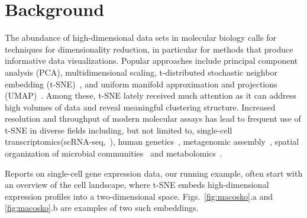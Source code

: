 \documentclass[twocolumn]{bmcart}
\begin{document}


\section*{Background}

The abundance of high-dimensional data sets in molecular biology calls for
techniques for dimensionality reduction, in particular for methods that produce informative data visualizations. Popular approaches include 
principal component analysis (PCA),
multidimensional scaling, t-distributed stochastic neighbor embedding
(t-SNE)~\cite{maaten2008visualizing}, and uniform manifold approximation and
projections (UMAP)~\cite{2018arXivUMAP}. 
Among these, t-SNE lately received much attention as it can address high
volumes of data and reveal meaningful clustering structure. Increased
resolution and throughput of modern molecular assays has lead to frequent use
of t-SNE in diverse fields including, but not limited to, single-cell
transcriptomics(scRNA-seq,~\cite{macosko2015highly,cao2019single,tasic2018shared}),
human genetics~\cite{hirata2019genetic}, metagenomic
assembly~\cite{beaulaurier2018metagenomic}, spatial organization of microbial
communities~\cite{sheth2019spatial} and
metabolomics~\cite{tkachev2019differences}.

Reports on single-cell gene expression data, our running example,
often start with an overview of the cell landscape, where t-SNE embeds
high-dimensional expression profiles into a two-dimensional
space. Figs.~\ref{fig:macosko}.a and \ref{fig:macosko}.b are examples of two such
embeddings.
\end{document}
